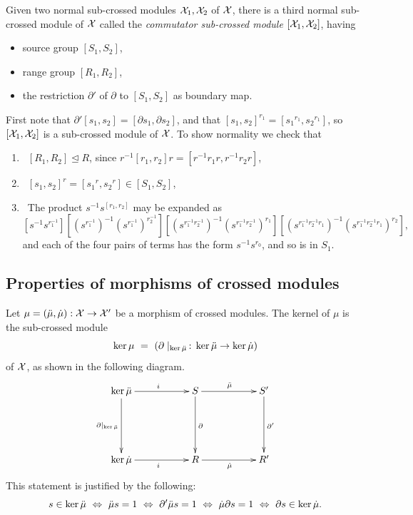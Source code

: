 \begin{prop}
Given two normal sub-crossed modules $\mathcal{X}_1, \mathcal{X}_2$ of $\mathcal{X}$, 
there is a third normal sub-crossed module of $\mathcal{X}$ 
called the \emph{commutator sub-crossed module} 
$[\mathcal{X}_1,\mathcal{X}_2]$, having
\begin{itemize}
\item source group $[S_1,S_2]$,
\item range group $[R_1,R_2]$,
\item the restriction $\partial'$ of $\partial$ to $[S_1,S_2]$ 
as boundary map. 
\end{itemize}
\end{prop}
\begin{pf}
First note that $\partial'[s_1,s_2] = [\partial s_1, \partial s_2]$, 
and that $[s_1,s_2]^{r_1} = [{s_1}^{r_1}, {s_2}^{r_1}]$, 
so $[\mathcal{X}_1,\mathcal{X}_2]$ is a sub-crossed module of $\mathcal{X}$.
To show normality we check that
\begin{enumerate}[{\rm (a)}]
\item ~$[R_1,R_2] \unlhd R$, 
since $r^{-1}[r_1,r_2]r = [r^{-1}r_1r,r^{-1}r_2r]$, 
\item ~$[s_1,s_2]^r = [{s_1}^r,{s_2}^r] \in [S_1,S_2]$,
\item ~The product $s^{-1}s^{[r_1,r_2]}$ may be expanded as  
$$ 
\left[s^{-1}s^{r_1^{-1}}\right]
\left[\left(s^{r_1^{-1}}\right)^{-1}\left(s^{r_1^{-1}}\right)^{r_2^{-1}}\right] 
\left[\left(s^{r_1^{-1}r_2^{-1}}\right)^{-1}
      \left(s^{r_1^{-1}r_2^{-1}}\right)^{r_1}\right] 
\left[\left(s^{r_1^{-1}r_2^{-1}r_1}\right)^{-1}
      \left(s^{r_1^{-1}r_2^{-1}r_1}\right)^{r_2}\right], 
$$
and each of the four pairs of terms has the form $s^{-1}s^{r_0}$, 
and so is in $S_1$. 
\end{enumerate}
\end{pf}



\subsection{Properties of morphisms of crossed modules} 
\label{subs:mor-props}

Let $\mu = (\ddot{\mu},\dot{\mu}) : \mathcal{X} \to \mathcal{X}'$  be a morphism of crossed modules.
The kernel of $\mu$ is the sub-crossed module
$$
\ker\mu ~=~ (\partial\mid_{\ker\ddot{\mu}} \,:\, \ker\ddot{\mu} \to \ker\dot{\mu})
$$
of $\mathcal{X}$, as shown in the following diagram.
$$
\xy
\xymatrix{
    \ker\ddm \ar[dd]_{\partial\mid_{\ker\ddm}}
               \ar[rr]^i
    &&    S  \ar[rr]^{\ddm} 
             \ar[dd]^{\partial} 
      &&  S' \ar[dd]^{\partial'}  \\
    &&&& \\
    \ker\dm \ar[rr]_i
    &&    R  \ar[rr]_{\dm}
      &&  R' \\ 
}
\endxy
$$
This statement is justified by the following:
$$
s \in \ker\ddot{\mu} ~\Leftrightarrow~
\ddot{\mu} s = 1 ~\Leftrightarrow~ 
\partial'\ddot{\mu} s = 1 ~\Leftrightarrow~ 
\dot{\mu}\partial s = 1 ~\Leftrightarrow~ 
\partial s \in \ker\dot{\mu}.
$$


